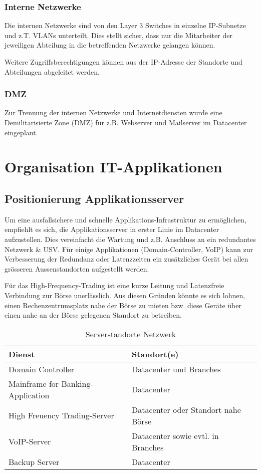 \subsubsection{Interne Netzwerke}

Die internen Netzwerke sind von den Layer 3 Switches in einzelne IP-Subnetze und z.T. VLANs unterteilt. Dies stellt sicher, dass nur die Mitarbeiter der jeweiligen Abteilung in die betreffenden Netzwerke gelangen können.

Weitere Zugriffsberechtigungen können aus der IP-Adresse der Standorte und Abteilungen abgeleitet werden.

\subsubsection{DMZ}

Zur Trennung der internen Netzwerke und Internetdiensten wurde eine Demilitarisierte Zone (DMZ) für z.B. Webserver und Mailserver im Datacenter eingeplant.

\section{Organisation IT-Applikationen}

\subsection{Positionierung Applikationsserver}

Um eine ausfallsichere und schnelle Applikations-Infrastruktur zu ermöglichen, empfiehlt es sich, die Applikationsserver in erster Linie im Datacenter aufzustellen. Dies vereinfacht die Wartung und z.B. Anschluss an ein redundantes Netzwerk \& USV. Für einige Applikationen (Domain-Controller, VoIP) kann zur Verbesserung der Redundanz oder Latenzzeiten ein zusätzliches Gerät bei allen grösseren Aussenstandorten aufgestellt werden.

Für das High-Frequency-Trading ist eine kurze Leitung und Latenzfreie Verbindung zur Börse unerlässlich. Aus diesen Gründen könnte es sich lohnen, einen Rechenzentrumsplatz nahe der Börse zu mieten bzw. diese Geräte über einen nahe an der Börse gelegenen Standort zu betreiben.

\begin{table}[h]
	\centering
	\begin{tabu} to \linewidth {l l}
		\toprule
		Dienst & Standort(e) \\
		\midrule
		Domain Controller & Datacenter und Branches \\
		Mainframe for Banking-Application & Datacenter \\
		High Freuency Trading-Server & Datacenter oder Standort nahe Börse \\
		VoIP-Server & Datacenter sowie evtl. in Branches\\
		Backup Server & Datacenter \\
		\bottomrule
	\end{tabu} 
	\label{tbl:server_standorte}
	\caption{Serverstandorte Netzwerk}
\end{table}

